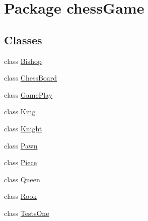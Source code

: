 \hypertarget{namespacechess_game}{}\section{Package chess\+Game}
\label{namespacechess_game}
\subsection*{Classes}
\begin{DoxyCompactItemize}
\item 
class \hyperlink{classchess_game_1_1_bishop}{Bishop}
\item 
class \hyperlink{classchess_game_1_1_chess_board}{Chess\+Board}
\item 
class \hyperlink{classchess_game_1_1_game_play}{Game\+Play}
\item 
class \hyperlink{classchess_game_1_1_king}{King}
\item 
class \hyperlink{classchess_game_1_1_knight}{Knight}
\item 
class \hyperlink{classchess_game_1_1_pawn}{Pawn}
\item 
class \hyperlink{classchess_game_1_1_piece}{Piece}
\item 
class \hyperlink{classchess_game_1_1_queen}{Queen}
\item 
class \hyperlink{classchess_game_1_1_rook}{Rook}
\item 
class \hyperlink{classchess_game_1_1_tests_one}{Tests\+One}
\end{DoxyCompactItemize}
